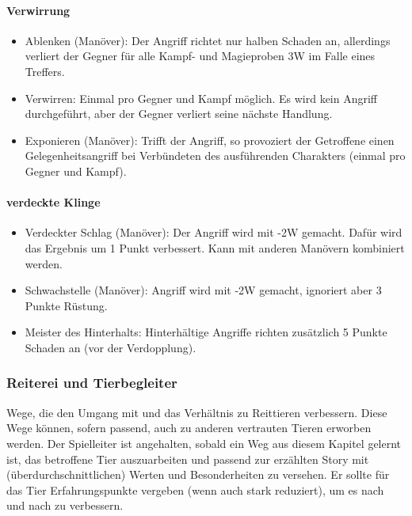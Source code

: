 \documentclass{article}
\begin{document}
\paragraph{Verwirrung}

\begin{itemize}
\item Ablenken (Manöver): Der Angriff richtet nur halben Schaden an, allerdings verliert der Gegner für alle Kampf- und Magieproben 3W im Falle eines Treffers.
\item Verwirren: Einmal pro Gegner und Kampf möglich. Es wird kein Angriff durchgeführt, aber der Gegner verliert seine nächste Handlung.
\item Exponieren (Manöver): Trifft der Angriff, so provoziert der Getroffene einen Gelegenheitsangriff bei Verbündeten des ausführenden Charakters (einmal pro Gegner und Kampf).
\end{itemize}

\paragraph{verdeckte Klinge}

\begin{itemize}
\item Verdeckter Schlag (Manöver): Der Angriff wird mit -2W gemacht. Dafür wird das Ergebnis um 1 Punkt verbessert. Kann mit anderen Manövern kombiniert werden.
\item Schwachstelle (Manöver): Angriff wird mit -2W gemacht, ignoriert aber 3 Punkte Rüstung.
\item Meister des Hinterhalts: Hinterhältige Angriffe richten zusätzlich 5 Punkte Schaden an (vor der Verdopplung).
\end{itemize}

\subsubsection{Reiterei und Tierbegleiter}

Wege, die den Umgang mit und das Verhältnis zu Reittieren verbessern. Diese Wege können, sofern passend, auch zu
anderen vertrauten Tieren erworben werden. Der Spielleiter ist angehalten, sobald ein Weg aus diesem Kapitel
gelernt ist, das betroffene Tier auszuarbeiten und passend zur erzählten Story mit (überdurchschnittlichen)
Werten und Besonderheiten zu versehen. Er sollte für das Tier Erfahrungspunkte vergeben (wenn auch stark reduziert),
um es nach und nach zu verbessern.
\end{document}
